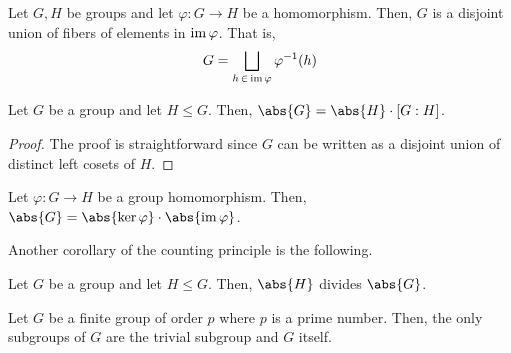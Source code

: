 \begin{prop} \label{prop:disjoint-union-of-fibers}
    Let $G,H$ be groups and let $\varphi \colon G \to H$ be a homomorphism. Then, $G$ is a disjoint union of fibers of elements in $\operatorname{im}\varphi$. That is,
    \[
        G = \bigsqcup_{h \, \in \, \operatorname{im}\varphi} \varphi^{-1}(h)
    \]
\end{prop}

\begin{theorem} \label{thm:counting-principle}
    Let $G$ be a group and let $H \leq G$. Then, $\abs{G} = \abs{H} \cdot [G:H]$.
\end{theorem}
\begin{proof}
    The proof is straightforward since $G$ can be written as a disjoint union of distinct left cosets of $H$.
\end{proof}
\begin{cor} \label{cor:rank-nullity}
    Let $\varphi \colon G \to H$ be a group homomorphism. Then, $\abs{G} = \abs{\ker\varphi} \cdot \abs{\im\varphi}$.
\end{cor}
Another corollary of the counting principle is the following.
\begin{theorem} \label{thm:lagrange}
    Let $G$ be a group and let $H \leq G$. Then, $\abs{H}$ divides $\abs{G}$.
\end{theorem}

\begin{cor} \label{cor:prime-subgroups}
    Let $G$ be a finite group of order $p$ where $p$ is a prime number. Then, the only subgroups of $G$ are the trivial subgroup and $G$ itself.
\end{cor}




